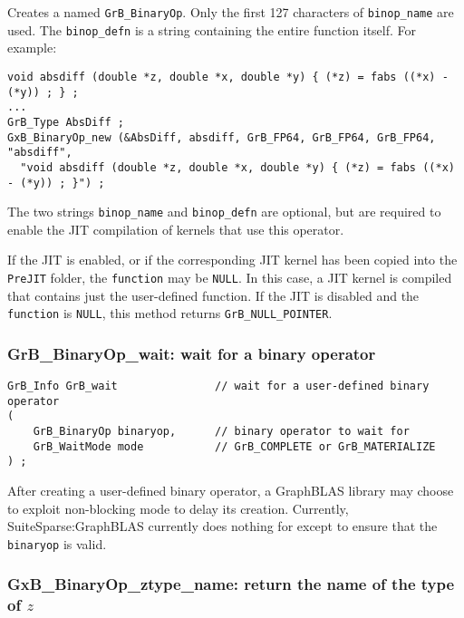 \documentclass[12pt]{article}
\begin{document}
Creates a named \verb'GrB_BinaryOp'.  Only the first 127 characters of
\verb'binop_name' are used.  The \verb'binop_defn' is a string containing the
entire function itself.  For example:

{\footnotesize
\begin{verbatim}
void absdiff (double *z, double *x, double *y) { (*z) = fabs ((*x) - (*y)) ; } ;
...
GrB_Type AbsDiff ;
GxB_BinaryOp_new (&AbsDiff, absdiff, GrB_FP64, GrB_FP64, GrB_FP64, "absdiff",
  "void absdiff (double *z, double *x, double *y) { (*z) = fabs ((*x) - (*y)) ; }") ; \end{verbatim}}

The two strings \verb'binop_name' and \verb'binop_defn' are optional, but are
required to enable the JIT compilation of kernels that use this operator.

If the JIT is enabled, or if the corresponding JIT kernel has been copied
into the \verb'PreJIT' folder, the \verb'function' may be \verb'NULL'.  In this
case, a JIT kernel is compiled that contains just the user-defined function.
If the JIT is disabled and the \verb'function' is \verb'NULL', this method
returns \verb'GrB_NULL_POINTER'.

\subsubsection{{\sf GrB\_BinaryOp\_wait:} wait for a binary operator}
\label{binaryop_wait}

\begin{mdframed}[userdefinedwidth=6in]
{\footnotesize
\begin{verbatim}
GrB_Info GrB_wait               // wait for a user-defined binary operator
(
    GrB_BinaryOp binaryop,      // binary operator to wait for
    GrB_WaitMode mode           // GrB_COMPLETE or GrB_MATERIALIZE
) ;
\end{verbatim}
}\end{mdframed}

After creating a user-defined binary operator, a GraphBLAS library may choose
to exploit non-blocking mode to delay its creation.  Currently,
SuiteSparse:GraphBLAS currently does nothing for except to ensure that the
\verb'binaryop' is valid.

\newpage
\subsubsection{{\sf GxB\_BinaryOp\_ztype\_name:} return the name of the type of $z$}
\label{binaryop_ztype_name}
\end{document}
